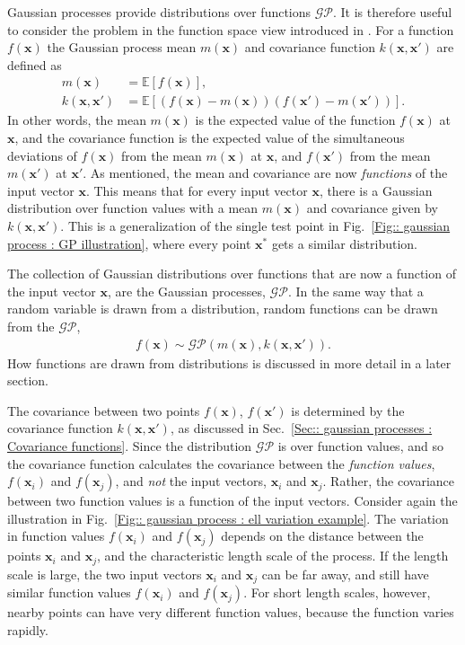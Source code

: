\documentclass[twoside,english]{uiofysmaster}
\begin{document}
Gaussian processes provide distributions over functions $\mathcal{GP}$. It is therefore useful to consider the problem in the function space view introduced in \cite{rasmussen2006gaussian}. For a function $f(\textbf{x})$ the Gaussian process mean $m(\textbf{x})$ and covariance function $k(\textbf{x}, \textbf{x}')$ are defined as
\begin{align}
m(\textbf{x}) &= \mathbb{E}[f(\textbf{x})],\\
k(\textbf{x}, \textbf{x}') &= \mathbb{E} [(f(\textbf{x}) - m(\textbf{x}))(f(\textbf{x}') - m(\textbf{x}'))].
\end{align}
In other words, the mean $m(\textbf{x})$ is the expected value of the function $f(\textbf{x})$ at $\textbf{x}$, and the covariance function is the expected value of the simultaneous deviations of $f(\textbf{x})$ from the mean $m(\textbf{x})$ at $\textbf{x}$, and $f(\textbf{x}')$ from the mean $m(\textbf{x}')$ at $\textbf{x}'$. As mentioned, the mean and covariance are now \textit{functions} of the input vector $\textbf{x}$. This means that for every input vector $\textbf{x}$, there is a Gaussian distribution over function values with a mean $m(\textbf{x})$ and covariance given by $k(\textbf{x}, \textbf{x}')$. This is a generalization of the single test point in Fig.~\ref{Fig:: gaussian process : GP illustration}, where every point $\textbf{x}^*$ gets a similar distribution.

The collection of Gaussian distributions over functions that are now a function of the input vector $\textbf{x}$, are the Gaussian processes, $\mathcal{GP}$. In the same way that a random variable is drawn from a distribution, random functions can be drawn from the $\mathcal{GP}$,
\begin{align}
f(\textbf{x}) \sim \mathcal{GP}(m(\textbf{x}), k(\textbf{x}, \textbf{x}')).
\end{align}
How functions are drawn from distributions is discussed in more detail in a later section.

The covariance between two points $f(\textbf{x})$, $f(\textbf{x}')$ is determined by the covariance function $k(\textbf{x}, \textbf{x}')$, as discussed in Sec.~\ref{Sec:: gaussian processes : Covariance functions}. Since the distribution $\mathcal{GP}$ is over function values, and so the covariance function calculates the covariance between the \textit{function values}, $f(\textbf{x}_i)$ and $f(\textbf{x}_j)$, and \textit{not} the input vectors, $\textbf{x}_i$ and $\textbf{x}_j$. Rather, the covariance between two function values is a function of the input vectors. Consider again the illustration in Fig.~\ref{Fig:: gaussian process : ell variation example}. The variation in function values $f(\textbf{x}_i)$ and $f(\textbf{x}_j)$ depends on the distance between the points $\textbf{x}_i$ and $\textbf{x}_j$, and the characteristic length scale of the process. If the length scale is large, the two input vectors $\textbf{x}_i$ and $\textbf{x}_j$ can be far away, and still have similar function values $f(\textbf{x}_i)$ and $f(\textbf{x}_j)$. For short length scales, however, nearby points can have very different function values, because the function varies rapidly.
\end{document}
